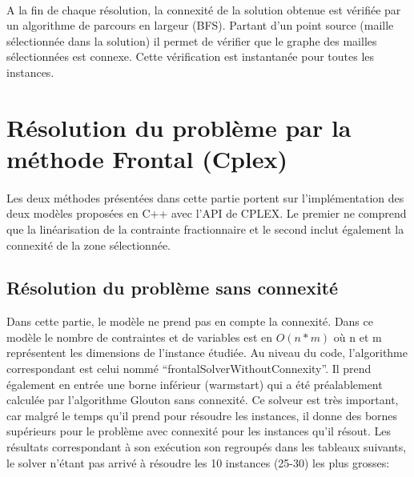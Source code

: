 \documentclass[a4paper, 11pt]{article} %
\begin{document}
\paragraph*{}
A la fin de chaque résolution, la connexité de la solution obtenue est vérifiée par un algorithme de parcours en largeur (BFS). Partant d'un point source (maille sélectionnée dans la solution) il permet de vérifier que le graphe des mailles sélectionnées est connexe. Cette vérification est instantanée pour toutes les instances.


\section{Résolution du problème par la méthode Frontal (Cplex)}

\paragraph*{}
Les deux méthodes présentées dans cette partie portent sur l'implémentation des deux modèles proposées en C++ avec l'API de CPLEX. Le premier ne comprend que la linéarisation de la contrainte fractionnaire et le second inclut également la connexité de la zone sélectionnée.

\subsection{Résolution du problème sans connexité}

Dans cette partie, le modèle ne prend pas en compte la connexité. Dans ce modèle le nombre de contraintes et de variables est en $O(n*m)$ où n et m représentent les dimensions de l'instance étudiée. Au niveau du code, l'algorithme correspondant est celui nommé ``frontalSolverWithoutConnexity''. Il prend également en entrée une borne inférieur (warmstart) qui a été préalablement calculée par l'algorithme Glouton sans connexité. Ce solveur est très important, car malgré le temps qu'il prend pour résoudre les instances, il donne des bornes supérieurs pour le problème avec connexité pour les instances qu'il résout. Les résultats correspondant à son exécution son regroupés dans les tableaux suivants, le solver n'étant pas arrivé à résoudre les 10 instances (25-30) les plus grosses:
\end{document}
